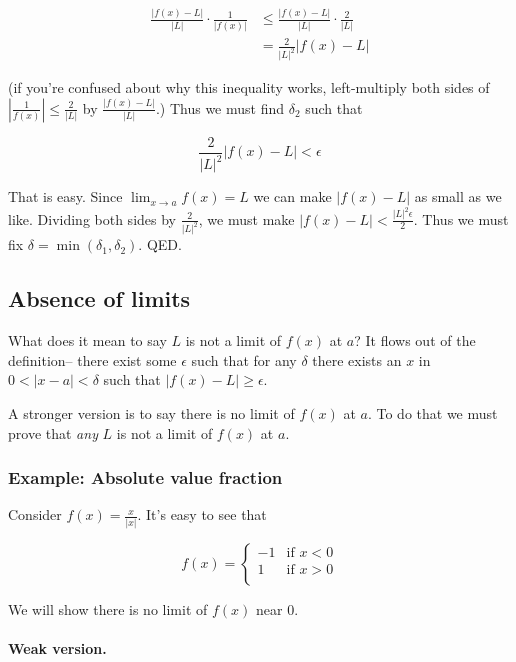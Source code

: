 \begin{align*}
  \frac{|f(x)-L|}{|L|}\cdot\frac{1}{|f(x)|}&\leq\frac{|f(x)-L|}{|L|}\cdot\frac{2}{|L|}\\
                                       &=\frac{2}{|L|^2}|f(x)-L|
\end{align*}

(if you're confused about why this inequality works, left-multiply both sides of
$|\frac{1}{f(x)}|\leq \frac{2}{|L|}$ by $\frac{|f(x)-L|}{|L|}$.) Thus we
must find $\delta_2$ such that

\[\frac{2}{|L|^2}|f(x)-L|<\epsilon\]

That is easy. Since $\lim_{x\to a}f(x)=L$ we can make $|f(x)-L|$ as
small as we like. Dividing both sides by $\frac{2}{|L|^2}$, we must
make $|f(x)-L|<\frac{|L|^2\epsilon}{2}$. Thus we must fix
$\delta=\min(\delta_1, \delta_2)$. QED.

\subsection{Absence of limits}

What does it mean to say $L$ is not a limit of $f(x)$ at $a$? It flows
out of the definition-- there exist some $\epsilon$ such that for any
$\delta$ there exists an $x$ in $0<|x-a|<\delta$ such that $|f(x)-L|\geq\epsilon$.

\vs

A stronger version is to say there is no limit of $f(x)$ at $a$. To do
that we must prove that \textit{any} $L$ is not a limit of $f(x)$ at
$a$.

\subsubsection*{Example: Absolute value fraction}

Consider $f(x)=\frac{x}{|x|}$. It's easy to see that

\[f(x)=\begin{cases}
    -1 & \text{if } x<0\\
    1 & \text{if } x>0\\
\end{cases}\]

We will show there is no limit of $f(x)$ near $0$.

\paragraph{Weak version.}

